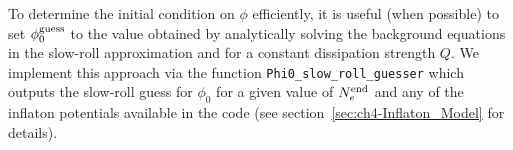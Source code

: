 \begin{subappendices}
To determine the initial condition on $\phi$ efficiently, it is useful (when possible) to set $\phi_0^{\rm{guess}}$ to the value obtained by analytically solving the background equations in the slow-roll approximation and for a constant dissipation strength $Q$. We implement this approach via the function \texttt{Phi0\_slow\_roll\_guesser} which outputs the slow-roll guess for $\phi_0$ for a given value of $N_e^{\rm{end}}$ and any of the inflaton potentials available in the code (see section~\ref{sec:ch4-Inflaton_Model} for details).

\end{subappendices}

